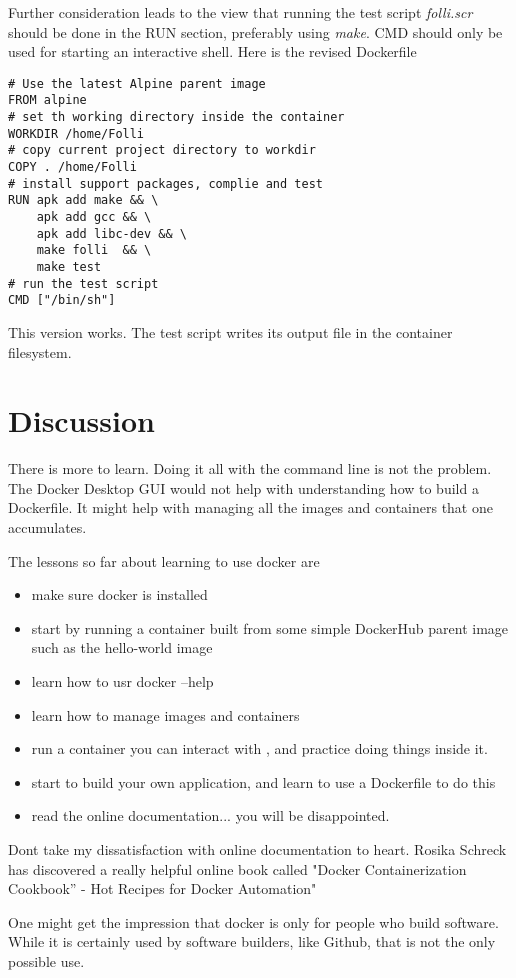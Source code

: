 \documentclass{article}  %
\begin{document}
Further consideration leads to the view that running the test script {\em folli.scr} should be done in the RUN section, preferably using {\em make}. CMD should only be used for starting an interactive shell. Here is the revised Dockerfile
\begin{verbatim}
# Use the latest Alpine parent image
FROM alpine
# set th working directory inside the container
WORKDIR /home/Folli
# copy current project directory to workdir
COPY . /home/Folli
# install support packages, complie and test
RUN apk add make && \
    apk add gcc && \
    apk add libc-dev && \
    make folli  && \
    make test
# run the test script
CMD ["/bin/sh"]
\end{verbatim}
 This version works. The test script writes its output file in the container filesystem.

\section{Discussion}
There is more to learn. Doing it all with the command line is not the problem. The Docker Desktop GUI would not help with understanding how to build a Dockerfile. It might help with managing all the images and containers that one accumulates. 

The lessons so far about learning to use docker are
\begin{itemize}
\item make sure docker is installed
\item start by running a container built from some simple DockerHub parent image such as the hello-world image
\item learn how to usr docker --help
\item learn how to manage images and containers
\item run a container you can interact with , and practice doing things inside it.
\item start to build your own application, and learn to use a Dockerfile to do this
\item read the online documentation... you will be disappointed.
\end{itemize}

Dont take my dissatisfaction with online documentation to heart. Rosika Schreck has discovered a really helpful online book called "Docker Containerization Cookbook” - Hot Recipes for Docker Automation"~\cite{dock:10}

One might get the impression that docker is only for people who build software.  While it is certainly used by software builders, like Github, that is not the only possible use. 
\end{document}
